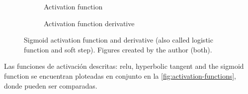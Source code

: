 \begin{figure}[ht]
  \centering
  \begin{subfigure}[b]{.375\textwidth}
    \centering
    \caption{Activation function}
  \end{subfigure}\hspace{3em}
  \begin{subfigure}[b]{.375\textwidth}
    \centering
    \caption{Activation function derivative}
  \end{subfigure}
  \caption[Sigmoid activation function]{Sigmoid activation function and
    derivative (also called logistic function and soft step). Figures created
    by the author (both).}%
  \label{fig:sigmoid}
\end{figure}

Las funciones de activación descritas: \gls{relu}, hyperbolic tangent and the
sigmoid function se encuentran ploteadas en conjunto en la
\vref{fig:activation-functions}, donde pueden ser comparadas.


